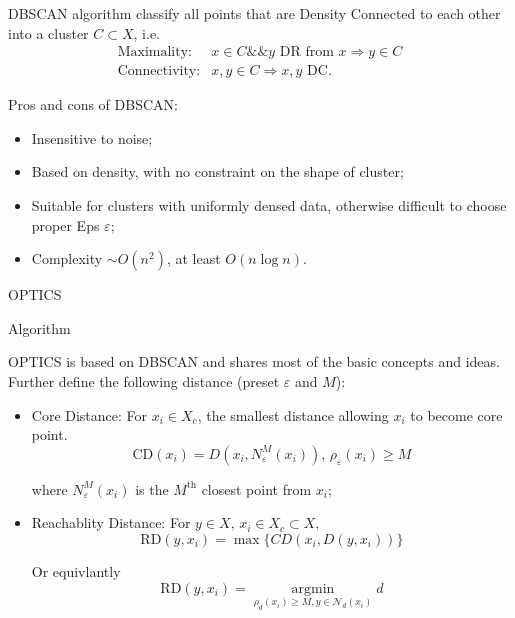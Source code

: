     DBSCAN algorithm classify all points that are Density Connected to each other into a cluster $ C\subset X $, i.e.
    \begin{align}
        \text{Maximality:}& x\in C\&\& y\text{ DR from } x \Rightarrow y\in C\\
        \text{Connectivity:}& x,y\in C\Rightarrow x,y\text{ DC}.
    \end{align} 
        
    Pros and cons of DBSCAN:
\begin{itemize}[topsep=2pt,itemsep=2pt]
    \item Insensitive to noise;
    \item Based on density, with no constraint on the shape of cluster; 
    \item Suitable for clusters with uniformly densed data, otherwise difficult to choose proper Eps $ \varepsilon  $;
    \item Complexity $ \sim O(n^2) $, at least $ O(n\log n) $.
\end{itemize}


\begin{point}
    \hypertarget{OPTICS}{OPTICS} Algorithm
\end{point}

    OPTICS is based on DBSCAN and shares most of the basic concepts and ideas. Further define the following distance (preset $ \varepsilon  $ and $ M $):
    \begin{itemize}[topsep=2pt,itemsep=2pt]
        \item Core Distance: For $ x_i\in X_c $, the smallest distance allowing $ x_i $ to become core point.
        \begin{equation}
            \mathrm{CD}(x_i)=D(x_i,N^M_\varepsilon (x_i)),\, \rho _\varepsilon (x_i)\geq M
        \end{equation}

        where $ N^M_\varepsilon (x_i) $ is the $ M^\mathrm{th} $ closest point from $ x_i $;
        \item Reachablity Distance: For $ y\in X,\,x_i \in X_c\subset X$, 
        \begin{equation}
            \mathrm{RD}(y,x_i)=\max\{CD(x_i,D(y,x_i))\}
        \end{equation}

        Or equivlantly
        \begin{equation}
            \mathrm{RD}(y,x_i)=\mathop{\arg\min}\limits_{\rho _d(x_i)\geq M, y\in \mathcal{N}_d(x_i)}  d
        \end{equation}
        
        
    \end{itemize}
    
